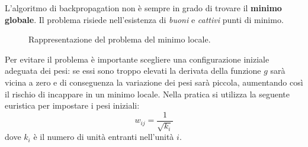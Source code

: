 L'algoritmo di backpropagation non è sempre in grado di trovare il \textbf{minimo globale}. Il problema risiede nell'esistenza di \emph{buoni} e \emph{cattivi} punti di minimo.

\begin{figure}[h!]
	\centering
	\caption{Rappresentazione del problema del minimo locale.}
\end{figure}

Per evitare il problema è importante scegliere una configurazione iniziale adeguata dei pesi: se essi sono troppo elevati la derivata della funzione $g$ sarà vicina a zero e di conseguenza la variazione dei pesi sarà piccola, aumentando così il rischio di incappare in un minimo locale. Nella pratica si utilizza la seguente euristica per impostare i pesi iniziali:
\begin{displaymath}
	w_{ij} = \frac{1}{\sqrt{k_i}}
\end{displaymath}
dove $k_i$ è il numero di unità entranti nell'unità $i$.
